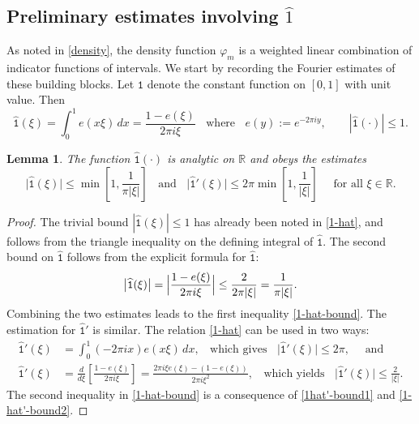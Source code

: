 \documentclass[12pt, twoside]{article}
\newtheorem{lemma}[theorem]{Lemma}
\theoremstyle{definition}
\numberwithin{equation}{section}
\begin{document}
\subsection{Preliminary estimates involving $\widehat{1}$} 
As noted in \eqref{density}, the density function $\varphi_{m}$ is a weighted linear combination of indicator functions of intervals. We start by recording the Fourier estimates of these building blocks. 
Let $\mathtt 1$ denote the constant function on $[0,1]$ with unit value. Then 
\begin{equation} \label{1-hat} 
\widehat{\mathtt 1}(\xi) = \int_{0}^{1} e(x \xi) \, dx = \frac{1 - e(\xi)}{2 \pi i \xi} \; \; \text{ where } \; \; e(y) := e^{-2 \pi i y}, \qquad |\widehat{\mathtt 1}(\cdot)| \leq 1.  
\end{equation} 
\begin{lemma} \label{1-hat-lemma}
The function $\widehat{\mathtt 1}(\cdot)$ is analytic on $\mathbb R$ and obeys the estimates
\begin{equation} 
\bigl|\widehat{\mathtt 1}(\xi) \bigr| \leq \min \left[1, \frac{1}{\pi |\xi|} \right]  \; \; \text{ and } \; \; \bigl|\widehat{\mathtt 1}'(\xi) \bigr| \leq 2 \pi \min \left[ 1, \frac{1}{|\xi|}\right]  \quad \text{ for all } \xi \in \mathbb R. \label{1-hat-bound} 
\end{equation} 
\end{lemma} 
\begin{proof} 
The trivial bound $|\widehat{\mathtt 1}(\xi)| \leq 1$ has already been noted in \eqref{1-hat}, and follows from the triangle inequality on the defining integral of $\widehat{\mathtt 1}$.  The second bound on $\widehat{\mathtt 1}$ follows from the explicit formula for $\widehat{\mathtt 1}$: 
\[ \bigl| \widehat{\mathtt 1}(\xi) \bigr| =  \Bigl| \frac{1 - e(\xi)}{2 \pi i \xi}\Bigr| \leq \frac{2}{2 \pi |\xi|} = \frac{1}{\pi |\xi|}. \] 
Combining the two estimates leads to the first inequality \eqref{1-hat-bound}. 
\vskip0.1in 
\noindent The estimation for $\widehat{\mathtt 1}'$ is similar. The relation \eqref{1-hat} can be used in two ways:
\begin{align} 
\widehat{\mathtt 1}'(\xi) &= \int_{0}^{1} (- 2\pi i x) e(x \xi) \, dx, \; \; \text{ which gives } \; \; \bigl| \widehat{\mathtt 1}'(\xi) \bigr| \leq 2 \pi, \quad \text{ and } \label{1hat'-bound1} \\ 
\widehat{\mathtt 1}'(\xi) &= \frac{d}{d \xi} \left[\frac{1 - e(\xi)}{2 \pi i \xi} \right] = \frac{2 \pi i \xi e(\xi) - (1 - e(\xi))}{2 \pi i \xi^2}, \; \; \text{ which yields }  \; \; \bigl|\widehat{\mathtt 1}'(\xi) \bigr| \leq \frac{2}{|\xi|}. \label{1-hat'-bound2}
\end{align}  
The second inequality in \eqref{1-hat-bound} is a consequence of \eqref{1hat'-bound1} and \eqref{1-hat'-bound2}.  
\end{proof} 
\end{document}
